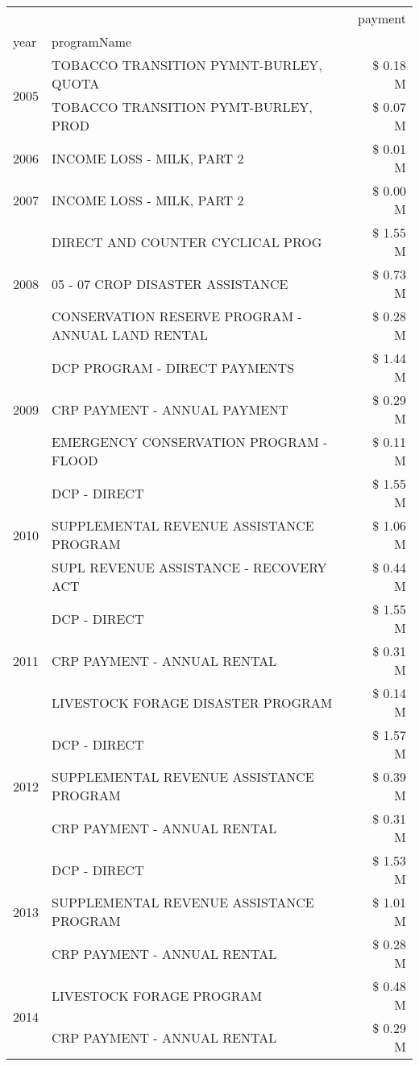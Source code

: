 \begin{tabular}{llr}
\toprule
 &  & payment \\
year & programName &  \\
\midrule
\multirow[t]{2}{*}{2005} & TOBACCO TRANSITION PYMNT-BURLEY, QUOTA & \$ 0.18 M \\
 & TOBACCO TRANSITION PYMT-BURLEY, PROD & \$ 0.07 M \\
\cline{1-3}
2006 & INCOME LOSS - MILK, PART 2 & \$ 0.01 M \\
\cline{1-3}
2007 & INCOME LOSS - MILK, PART 2 & \$ 0.00 M \\
\cline{1-3}
\multirow[t]{3}{*}{2008} & DIRECT AND COUNTER CYCLICAL PROG & \$ 1.55 M \\
 & 05 - 07 CROP DISASTER ASSISTANCE & \$ 0.73 M \\
 & CONSERVATION RESERVE PROGRAM - ANNUAL LAND RENTAL & \$ 0.28 M \\
\cline{1-3}
\multirow[t]{3}{*}{2009} & DCP PROGRAM - DIRECT PAYMENTS & \$ 1.44 M \\
 & CRP PAYMENT - ANNUAL PAYMENT & \$ 0.29 M \\
 & EMERGENCY CONSERVATION PROGRAM - FLOOD & \$ 0.11 M \\
\cline{1-3}
\multirow[t]{3}{*}{2010} & DCP - DIRECT & \$ 1.55 M \\
 & SUPPLEMENTAL REVENUE ASSISTANCE PROGRAM & \$ 1.06 M \\
 & SUPL REVENUE ASSISTANCE - RECOVERY ACT & \$ 0.44 M \\
\cline{1-3}
\multirow[t]{3}{*}{2011} & DCP - DIRECT & \$ 1.55 M \\
 & CRP PAYMENT - ANNUAL RENTAL & \$ 0.31 M \\
 & LIVESTOCK FORAGE DISASTER PROGRAM & \$ 0.14 M \\
\cline{1-3}
\multirow[t]{3}{*}{2012} & DCP - DIRECT & \$ 1.57 M \\
 & SUPPLEMENTAL REVENUE ASSISTANCE PROGRAM & \$ 0.39 M \\
 & CRP PAYMENT - ANNUAL RENTAL & \$ 0.31 M \\
\cline{1-3}
\multirow[t]{3}{*}{2013} & DCP - DIRECT & \$ 1.53 M \\
 & SUPPLEMENTAL REVENUE ASSISTANCE PROGRAM & \$ 1.01 M \\
 & CRP PAYMENT - ANNUAL RENTAL & \$ 0.28 M \\
\cline{1-3}
\multirow[t]{3}{*}{2014} & LIVESTOCK FORAGE PROGRAM & \$ 0.48 M \\
 & CRP PAYMENT - ANNUAL RENTAL & \$ 0.29 M \\

\end{tabular}
